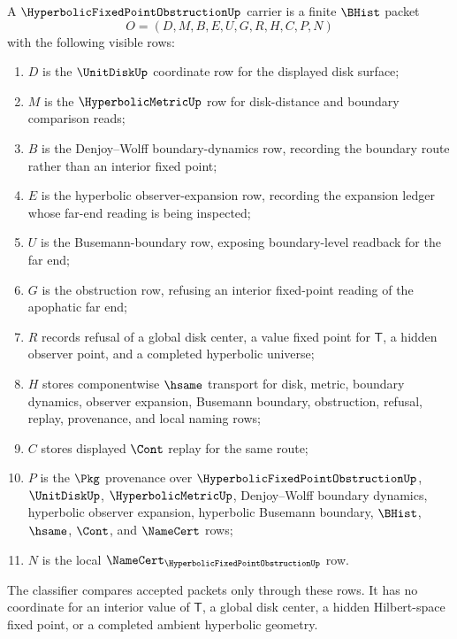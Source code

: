 \begin{definition}
\label{def:hyperbolic-fixed-point-obstruction-carrier}
A $\HyperbolicFixedPointObstructionUp$ carrier is a finite $\BHist$ packet
$$
O=(D,M,B,E,U,G,R,H,C,P,N)
$$
with the following visible rows:
\begin{enumerate}
\item $D$ is the $\UnitDiskUp$ coordinate row for the displayed disk surface;
\item $M$ is the $\HyperbolicMetricUp$ row for disk-distance and boundary comparison reads;
\item $B$ is the Denjoy--Wolff boundary-dynamics row, recording the boundary route rather than an interior fixed point;
\item $E$ is the hyperbolic observer-expansion row, recording the expansion ledger whose far-end reading is being inspected;
\item $U$ is the Busemann-boundary row, exposing boundary-level readback for the far end;
\item $G$ is the obstruction row, refusing an interior fixed-point reading of the apophatic far end;
\item $R$ records refusal of a global disk center, a value fixed point for $\mathsf{T}$, a hidden observer point, and a completed hyperbolic universe;
\item $H$ stores componentwise $\hsame$ transport for disk, metric, boundary dynamics, observer expansion, Busemann boundary, obstruction, refusal, replay, provenance, and local naming rows;
\item $C$ stores displayed $\Cont$ replay for the same route;
\item $P$ is the $\Pkg$ provenance over $\HyperbolicFixedPointObstructionUp$, $\UnitDiskUp$, $\HyperbolicMetricUp$, Denjoy--Wolff boundary dynamics, hyperbolic observer expansion, hyperbolic Busemann boundary, $\BHist$, $\hsame$, $\Cont$, and $\NameCert$ rows;
\item $N$ is the local $\NameCert_{\HyperbolicFixedPointObstructionUp}$ row.
\end{enumerate}
The classifier compares accepted packets only through these rows. It has no coordinate for an interior value of $\mathsf{T}$, a global disk center, a hidden Hilbert-space fixed point, or a completed ambient hyperbolic geometry.
\end{definition}


